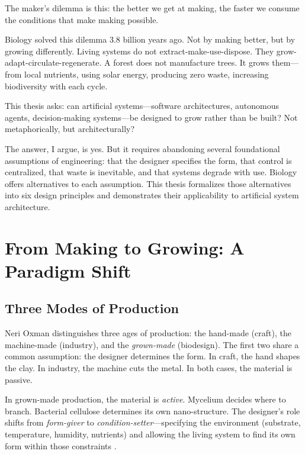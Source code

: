 \documentclass[11pt,a4paper]{article}
\begin{document}
The maker's dilemma is this: the better we get at making, the faster we consume the conditions that make making possible.

Biology solved this dilemma 3.8 billion years ago. Not by making better, but by growing differently. Living systems do not extract-make-use-dispose. They grow-adapt-circulate-regenerate. A forest does not manufacture trees. It grows them---from local nutrients, using solar energy, producing zero waste, increasing biodiversity with each cycle.

This thesis asks: can artificial systems---software architectures, autonomous agents, decision-making systems---be designed to grow rather than be built? Not metaphorically, but architecturally?

The answer, I argue, is yes. But it requires abandoning several foundational assumptions of engineering: that the designer specifies the form, that control is centralized, that waste is inevitable, and that systems degrade with use. Biology offers alternatives to each assumption. This thesis formalizes those alternatives into six design principles and demonstrates their applicability to artificial system architecture.

\section{From Making to Growing: A Paradigm Shift}

\subsection{Three Modes of Production}

Neri Oxman distinguishes three ages of production: the hand-made (craft), the machine-made (industry), and the \emph{grown-made} (biodesign). The first two share a common assumption: the designer determines the form. In craft, the hand shapes the clay. In industry, the machine cuts the metal. In both cases, the material is passive.

In grown-made production, the material is \emph{active}. Mycelium decides where to branch. Bacterial cellulose determines its own nano-structure. The designer's role shifts from \emph{form-giver} to \emph{condition-setter}---specifying the environment (substrate, temperature, humidity, nutrients) and allowing the living system to find its own form within those constraints \citep{oxman2015}.
\end{document}
